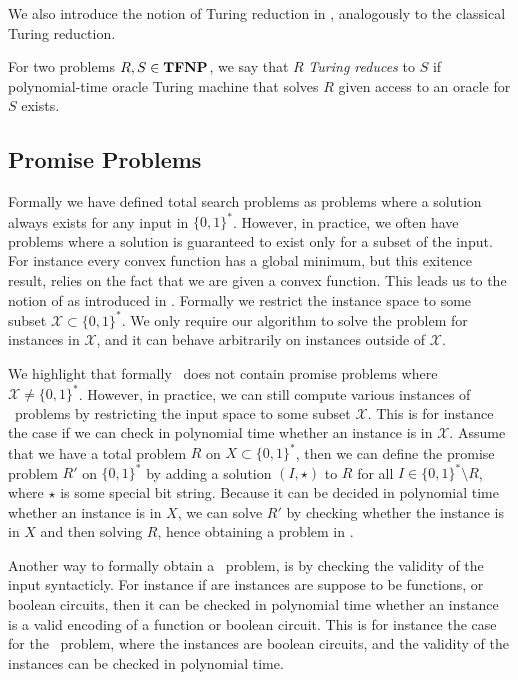 We also introduce the notion of Turing reduction in \TFNP, analogously to the classical Turing reduction.

\begin{definition}
    For two problems $R, S \in \textbf{TFNP}$, we say that $R$ \emph{Turing reduces} to $S$ if polynomial-time oracle Turing machine that solves $R$ given access to an oracle for $S$ exists.
\end{definition}

\subsection{Promise Problems}

Formally we have defined total search problems as problems where a solution always exists for any input in $\{0, 1\}^*$. However, in practice, we often have problems where a solution is guaranteed to exist only for a subset of the input. For instance every convex function has a global minimum, but this exitence result, relies on the fact that we are given a convex function. This leads us to the notion of  as introduced in . Formally we restrict the instance space to some subset $\mathcal{X} \subset \{0, 1\}^*$. We only require our algorithm to solve the problem for instances in $\mathcal{X}$, and it can behave arbitrarily on instances outside of $\mathcal{X}$.

We highlight that formally \TFNP\ does not contain promise problems where $\mathcal{X} \neq \{0, 1\}^*$. However, in practice, we can still compute various instances of \TFNP\ problems by restricting the input space to some subset $\mathcal{X}$. This is for instance the case if we can check in polynomial time whether an instance is in $\mathcal{X}$. Assume that we have a total problem $R$ on $X \subset \{0, 1\}^*$, then we can define the promise problem $R'$ on $\{0, 1\}^*$ by adding a solution $(I, \star)$ to $R$ for all $I \in \{0, 1\}^* \setminus R$, where $\star$ is some special bit string. Because it can be decided in polynomial time whether an instance is in $X$, we can solve $R'$ by checking whether the instance is in $X$ and then solving $R$, hence obtaining a problem in \TFNP.

Another way to formally obtain a \TFNP\ problem, is by checking the validity of the input syntacticly. For instance if are instances are suppose to be functions, or boolean circuits, then it can be checked in polynomial time whether an instance is a valid encoding of a function or boolean circuit. This is for instance the case for the \Tarski\ problem, where the instances are boolean circuits, and the validity of the instances can be checked in polynomial time.

